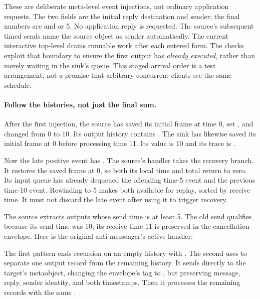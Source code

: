 These are deliberate meta-level event injections, not ordinary
application requests. The two  fields are the initial reply
destination and sender; the final numbers are  and
 or 5. No application reply is requested. The source's
subsequent timed sends name the source object as sender automatically.
The current interactive top-level drains runnable work after each
entered form. The checks exploit that boundary to ensure the first
output has \emph{already executed}, rather than merely waiting in the
sink's queue. This staged arrival order is a test arrangement, not a
promise that arbitrary concurrent clients see the same schedule.

\paragraph{Follow the histories, not just the final sum.}
After the first injection, the source has saved its initial frame at
time 0, set , and changed  from 0 to 10.
Its output history contains
.
The sink has likewise saved its initial frame at 0 before processing
time 11. Its value is 10 and its trace is .

Now the late positive event has .
The source's  handler takes the recovery branch.
It restores the saved frame at 0, so both its local time and total
return to zero. Its input queue has already dequeued the offending
time-5 event and the previous time-10 event. Rewinding to 5 makes both
available for replay, sorted by receive time. It must not discard the
late event after using it to trigger recovery.

The source extracts outputs whose send time is at least 5. The old
\code{[:value 10]} send qualifies because its send time was 10;
its receive time 11 is preserved in the cancellation envelope.
Here is the original anti-messenger's active handler:


The first pattern ends recursion on an empty history with .
The second uses  to separate one output record from the
remaining history. It sends directly to the target's metaobject,
changing the envelope's tag to , but preserving
message, reply, sender identity, and both timestamps. Then it processes
the remaining records with the same .

